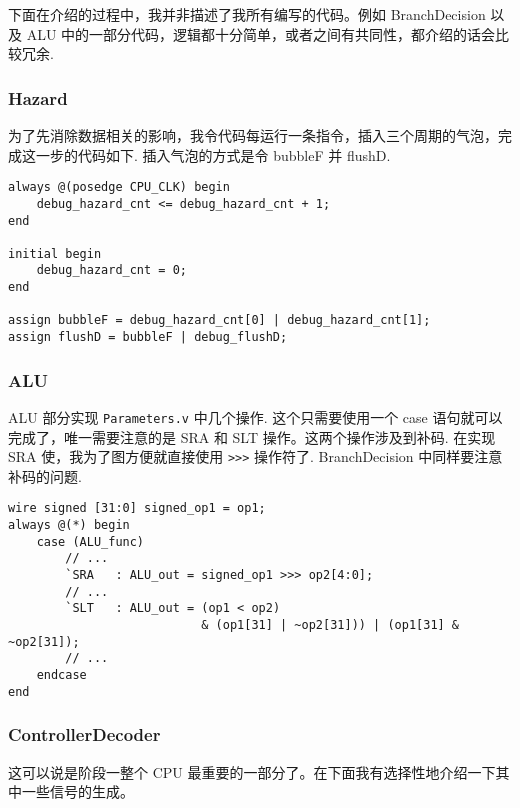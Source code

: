 \documentclass{article}
\begin{document}
下面在介绍的过程中，我并非描述了我所有编写的代码。例如 BranchDecision 以及 ALU 中的一部分代码，逻辑都十分简单，或者之间有共同性，都介绍的话会比较冗余.
\subsubsection{Hazard}
为了先消除数据相关的影响，我令代码每运行一条指令，插入三个周期的气泡，完成这一步的代码如下. 插入气泡的方式是令 bubbleF 并 flushD.
\begin{verbatim}
always @(posedge CPU_CLK) begin
    debug_hazard_cnt <= debug_hazard_cnt + 1;
end

initial begin
    debug_hazard_cnt = 0;
end

assign bubbleF = debug_hazard_cnt[0] | debug_hazard_cnt[1];
assign flushD = bubbleF | debug_flushD;
\end{verbatim}
\subsubsection{ALU}
ALU 部分实现 \texttt{Parameters.v} 中几个操作. 这个只需要使用一个 case 语句就可以完成了，唯一需要注意的是 SRA 和 SLT 操作。这两个操作涉及到补码. 在实现 SRA 使，我为了图方便就直接使用 \texttt{>>>} 操作符了. BranchDecision 中同样要注意补码的问题.
\begin{verbatim}
wire signed [31:0] signed_op1 = op1;
always @(*) begin
    case (ALU_func)
        // ...
        `SRA   : ALU_out = signed_op1 >>> op2[4:0];
        // ...
        `SLT   : ALU_out = (op1 < op2)
                           & (op1[31] | ~op2[31])) | (op1[31] & ~op2[31]);
        // ...
    endcase
end
\end{verbatim}
\subsubsection{ControllerDecoder}
这可以说是阶段一整个 CPU 最重要的一部分了。在下面我有选择性地介绍一下其中一些信号的生成。
\end{document}
